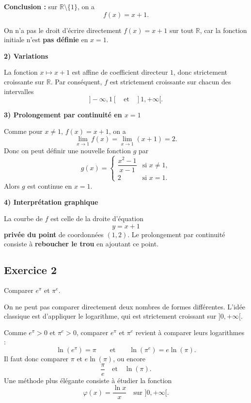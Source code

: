 \documentclass[11pt,a4paper]{article}
\newcommand{\R}{\mathbb{R}}
\begin{document}
\textbf{Conclusion :} sur \(\R\setminus\{1\}\), on a
\[
f(x)=x+1.
\]

\begin{logiquebox}
On n'a pas le droit d'écrire directement \(f(x)=x+1\) sur tout \(\R\), car la fonction initiale n'est \textbf{pas définie} en \(x=1\).
\end{logiquebox}

\textbf{2) Variations}

La fonction \(x\mapsto x+1\) est affine de coefficient directeur \(1\), donc strictement croissante sur \(\R\).  
Par conséquent, \(f\) est strictement croissante sur chacun des intervalles
\[
]-\infty,1[ \quad \text{et} \quad ]1,+\infty[.
\]

\textbf{3) Prolongement par continuité en \(x=1\)}

Comme pour \(x\neq 1\), \(f(x)=x+1\), on a
\[
\lim_{x\to 1} f(x)=\lim_{x\to 1}(x+1)=2.
\]
Donc on peut définir une nouvelle fonction \(g\) par
\[
g(x)=
\begin{cases}
\dfrac{x^2-1}{x-1} & \text{si } x\neq 1,\\
2 & \text{si } x=1.
\end{cases}
\]
Alors \(g\) est continue en \(x=1\).

\textbf{4) Interprétation graphique}

La courbe de \(f\) est celle de la droite d'équation
\[
y=x+1
\]
\textbf{privée du point} de coordonnées \((1,2)\).  
Le prolongement par continuité consiste à \textbf{reboucher le trou} en ajoutant ce point.

\subsection*{Exercice 2}
Comparer \(e^\pi\) et \(\pi^e\).

\begin{methodebox}
On ne peut pas comparer directement deux nombres de formes différentes.  
L'idée classique est d'appliquer le logarithme, qui est strictement croissant sur \(]0,+\infty[\).
\end{methodebox}

Comme \(e^\pi>0\) et \(\pi^e>0\), comparer \(e^\pi\) et \(\pi^e\) revient à comparer leurs logarithmes :
\[
\ln(e^\pi)=\pi
\qquad \text{et} \qquad
\ln(\pi^e)=e\ln(\pi).
\]
Il faut donc comparer \(\pi\) et \(e\ln(\pi)\), ou encore
\[
\frac{\pi}{e} \quad \text{et} \quad \ln(\pi).
\]
Une méthode plus élégante consiste à étudier la fonction
\[
\varphi(x)=\frac{\ln x}{x}
\quad \text{sur } ]0,+\infty[.
\]
\end{document}
